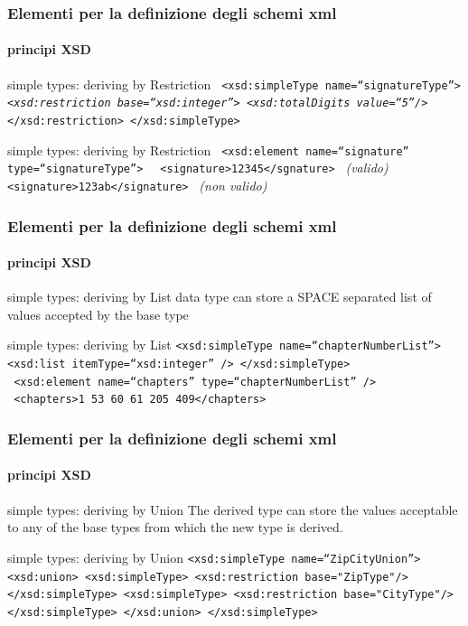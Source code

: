 \begin{frame}
	\frametitle{Elementi per la definizione degli schemi xml}
	\framesubtitle{principi XSD}
	\addtocounter{nframe}{1}

	\begin{block}{simple types: deriving by Restriction}
		\texttt{
			<xsd:simpleType name=``signatureType''>
			\textit{<xsd:restriction base=``xsd:integer''>}
			\textit{<xsd:totalDigits value=``5''/>}
			</xsd:restriction>
			</xsd:simpleType>
		}
	\end{block}

	\begin{block}{simple types: deriving by Restriction}
		\texttt{
			<xsd:element name=``signature'' type=``signatureType''>
		}
		\texttt{
			<signature>12345</sgnature>
		} \textit{(valido)}
		\texttt{
			<signature>123ab</signature>
		} \textit{(non valido)}
	\end{block}
\end{frame}


\begin{frame}
	\frametitle{Elementi per la definizione degli schemi xml}
	\framesubtitle{principi XSD}
	\addtocounter{nframe}{1}

	\begin{block}{simple types: deriving by List}
		data type can store a SPACE separated list of values accepted by the base type
	\end{block}

	\begin{block}{simple types: deriving by List}
		\texttt{<xsd:simpleType name=``chapterNumberList''>
			<xsd:list itemType=``xsd:integer'' />
			</xsd:simpleType>}
		\\\texttt{
			<xsd:element name=``chapters'' type=``chapterNumberList'' />}
		\\\texttt{
			<chapters>1 53 60 61 205 409</chapters>}
	\end{block}

\end{frame}

\begin{frame}
	\frametitle{Elementi per la definizione degli schemi xml}
	\framesubtitle{principi XSD}
	\addtocounter{nframe}{1}

	\begin{block}{simple types: deriving by Union}
		The derived type can store the values acceptable to any of the base types from which the new type is derived.
	\end{block}

	\begin{block}{simple types: deriving by Union}
		\texttt{<xsd:simpleType name=``ZipCityUnion''>
			<xsd:union>
			<xsd:simpleType>
			<xsd:restriction base="ZipType"/>
			</xsd:simpleType>
			<xsd:simpleType>
			<xsd:restriction base="CityType"/>
			</xsd:simpleType>
			</xsd:union>
			</xsd:simpleType>}

	\end{block}

\end{frame}



